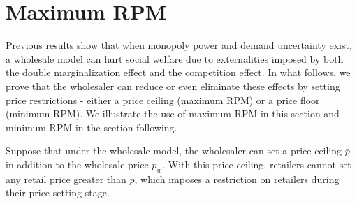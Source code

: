 \documentclass[12pt]{article}
\begin{document}





\section{Maximum RPM}

Previous results show that when monopoly power and demand uncertainty exist, a wholesale model can hurt social welfare due to externalities imposed by both the double marginalization effect and the competition effect. In what follows, we prove that the wholesaler can reduce or even eliminate these effects by setting price restrictions - either a price ceiling (maximum RPM) or a price floor (minimum RPM). We illustrate the use of maximum RPM in this section and minimum RPM in the section following.



Suppose that under the wholesale model, the wholesaler can set a price ceiling $\bar{p}$ in addition to the wholesale price $ p_w$. With this price ceiling, retailers cannot set any retail price greater than $\bar{p}$, which imposes a restriction on retailers during their price-setting stage.
\end{document}
